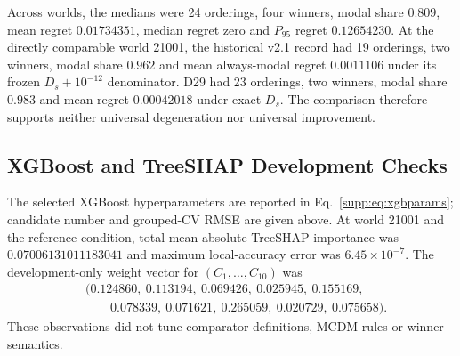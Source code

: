 \documentclass[runningheads]{llncs}
\begin{document}
\begin{table}[t]
\centering
\caption{Complete frozen D29 Layer-B development record.}
\label{supp:tab:d29layerb}
\scriptsize
{}
\end{table}

Across worlds, the medians were 24 orderings, four winners, modal share $0.809$, mean regret
$0.01734351$, median regret zero and $P_{95}$ regret $0.12654230$. At the directly comparable
world 21001, the historical v2.1 record had 19 orderings, two winners, modal share $0.962$ and
mean always-modal regret $0.0011106$ under its frozen $D_s+10^{-12}$ denominator. D29 had 23
orderings, two winners, modal share $0.983$ and mean regret $0.00042018$ under exact $D_s$.
The comparison therefore supports neither universal degeneration nor universal improvement.

\subsection{XGBoost and TreeSHAP Development Checks}

The selected XGBoost hyperparameters are reported in Eq.~\eqref{supp:eq:xgbparams}; candidate
number and grouped-CV RMSE are given above. At world 21001 and the reference condition, total mean-absolute
TreeSHAP importance was $0.07006131011183041$ and maximum local-accuracy error was
$6.45\times10^{-7}$. The development-only weight vector for $(C_1,\ldots,C_{10})$ was
\begin{equation}
\begin{split}
&(0.124860,\ 0.113194,\ 0.069426,\ 0.025945,\ 0.155169,\\
&\qquad 0.078339,\ 0.071621,\ 0.265059,\ 0.020729,\ 0.075658).
\end{split}
\label{supp:eq:devshapweights}
\end{equation}
These observations did not tune comparator definitions, MCDM rules or winner semantics.
\end{document}
